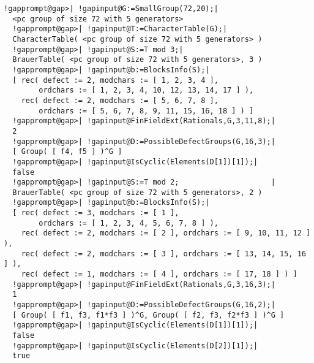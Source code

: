 \documentclass[a4paper,11pt]{report}
\begin{document}
{{{\begin{Verbatim}[commandchars=!@|,fontsize=\small,frame=single,label=Example]
  !gapprompt@gap>| !gapinput@G:=SmallGroup(72,20);|
  <pc group of size 72 with 5 generators>
  !gapprompt@gap>| !gapinput@T:=CharacterTable(G);|
  CharacterTable( <pc group of size 72 with 5 generators> )
  !gapprompt@gap>| !gapinput@S:=T mod 3;|
  BrauerTable( <pc group of size 72 with 5 generators>, 3 )
  !gapprompt@gap>| !gapinput@b:=BlocksInfo(S);|
  [ rec( defect := 2, modchars := [ 1, 2, 3, 4 ], 
        ordchars := [ 1, 2, 3, 4, 10, 12, 13, 14, 17 ] ), 
    rec( defect := 2, modchars := [ 5, 6, 7, 8 ], 
        ordchars := [ 5, 6, 7, 8, 9, 11, 15, 16, 18 ] ) ]
  !gapprompt@gap>| !gapinput@FinFieldExt(Rationals,G,3,11,8);|
  2
  !gapprompt@gap>| !gapinput@D:=PossibleDefectGroups(G,16,3);|
  [ Group( [ f4, f5 ] )^G ]
  !gapprompt@gap>| !gapinput@IsCyclic(Elements(D[1])[1]);|
  false
  !gapprompt@gap>| !gapinput@S:=T mod 2;                     |
  BrauerTable( <pc group of size 72 with 5 generators>, 2 )
  !gapprompt@gap>| !gapinput@b:=BlocksInfo(S);|
  [ rec( defect := 3, modchars := [ 1 ], 
        ordchars := [ 1, 2, 3, 4, 5, 6, 7, 8 ] ), 
    rec( defect := 2, modchars := [ 2 ], ordchars := [ 9, 10, 11, 12 ] ), 
    rec( defect := 2, modchars := [ 3 ], ordchars := [ 13, 14, 15, 16 ] ), 
    rec( defect := 1, modchars := [ 4 ], ordchars := [ 17, 18 ] ) ]
  !gapprompt@gap>| !gapinput@FinFieldExt(Rationals,G,3,16,3);|
  1
  !gapprompt@gap>| !gapinput@D:=PossibleDefectGroups(G,16,2);|
  [ Group( [ f1, f3, f1*f3 ] )^G, Group( [ f2, f3, f2*f3 ] )^G ]
  !gapprompt@gap>| !gapinput@IsCyclic(Elements(D[1])[1]);|
  false
  !gapprompt@gap>| !gapinput@IsCyclic(Elements(D[2])[1]);|
  true
  
\end{Verbatim}
 }

 

}}
\end{document}
